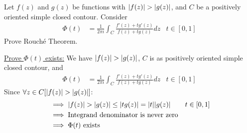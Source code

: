 \documentclass[12pt, english]{book}
\makeatletter
\renewenvironment{proof}[1][\proofname]{\par
	\pushQED{\qed}%
	\normalfont \topsep6\p@\@plus6\p@\relax
	\list{}{%
		\settowidth{\leftmargin}{\itshape\proofname:\hskip\labelsep}%
		\setlength{\labelwidth}{0pt}%
		\setlength{\itemindent}{-\leftmargin}%
		}%
	\item[\hskip\labelsep\itshape#1\@addpunct{:}]\ignorespaces
	}{\popQED\endlist\@endpefalse}
\makeatother
\begin{document}
	\begin{example}
		\label{Rouche's Theorem Alternate Proof - Complex}
		Let \(f(z)\) and \(g(z)\) be functions with \(\abs{f(z)} > \abs{g(z)}\), and \(C\) be a positively oriented simple closed contour. Consider 
		\begin{align*}
			\Phi(t) &= \frac{1}{2\pi i} \int_{C} \frac{f'(z) + t g'(z)}{f(z) + tg(z)} dz
				& t \in [0, 1]
		\end{align*}
		Prove Rouché Theorem.
		\begin{proof}
			{\color{Grey}
			\underline{Prove \(\Phi(t)\) exists:} \newline
			We have \(\abs{f(z)} > \abs{g(z)}\), \(C\) is as positively oriented simple closed contour, and 
			\begin{align*}
				\Phi(t) &= \frac{1}{2\pi i} \int_{C} \frac{f'(z) + t g'(z)}{f(z) + tg(z)} dz
				& t \in [0, 1]
			\end{align*}
			Since \(\forall z \in C [\abs{f(z)} > \abs{g(z)}]\):
			\begin{align*}
				&\implies \abs{f(z)} > \abs{g(z)} \leq \abs{tg(z)}  = \abs{t} \abs{g(z)} 
					& t \in [0, 1] \\
				&\implies \text{Integrand denominator is never zero} \\
				&\implies \Phi(t) \text{ exists}
			\end{align*}
			
}
\end{proof}
\end{example}
\end{document}
